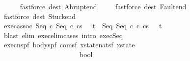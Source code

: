 \begin{isabellebody}
\ \ \isamarkupfalse%
\ \ \ {\isacharparenleft}fastforce\ dest{\isacharcolon}\ Abrupt{\isacharunderscore}end{\isacharparenright}\isanewline
\ \ \isamarkupfalse%
\ \ {\isacharparenleft}fastforce\ dest{\isacharcolon}\ Fault{\isacharunderscore}end{\isacharparenright}\isanewline
\ \ \isamarkupfalse%
\ {\isacharparenleft}fastforce\ dest{\isacharcolon}\ Stuck{\isacharunderscore}end{\isacharparenright}\isanewline
\ \ \isamarkupfalse%
%
\endisatagproof
{\isafoldproof}%
%
\isadelimproof
\isanewline
%
\endisadelimproof
\isanewline
\isanewline
{}\isamarkupfalse%
\ exec{\isacharunderscore}assoc{\isacharcolon}\ {\isachardoublequoteopen}{\isasymGamma}{\isasymturnstile}{\isasymlangle}Seq\ c{}\ {\isacharparenleft}Seq\ c{}\ c{}{\isacharparenright}{\isacharcomma}s{\isasymrangle}\ {\isasymRightarrow}\ \ t\ {\isacharequal}\ {\isasymGamma}{\isasymturnstile}{\isasymlangle}Seq\ {\isacharparenleft}Seq\ c{}\ c{}{\isacharparenright}\ c{}{\isacharcomma}s{\isasymrangle}\ {\isasymRightarrow}\ \ t{\isachardoublequoteclose}\isanewline
%
\isadelimproof
\ \ %
\endisadelimproof
%
\isatagproof
{}\isamarkupfalse%
\ {\isacharparenleft}blast\ elim{\isacharbang}{\isacharcolon}\ exec{\isacharunderscore}elim{\isacharunderscore}cases\ intro{\isacharcolon}\ exec{\isacharunderscore}Seq{\isacharprime}\ {\isacharparenright}%
\endisatagproof
{\isafoldproof}%
%
\isadelimproof
%
\endisadelimproof
%
\isamarkuptrue%
\isamarkupfalse%
\ {\isachardoublequoteopen}execn{\isachardoublequoteclose}{\isacharcolon}{\isacharcolon}{\isachardoublequoteopen}{\isacharbrackleft}{\isacharparenleft}{\isacharprime}s{\isacharcomma}{\isacharprime}p{\isacharcomma}{\isacharprime}f{\isacharparenright}\ body{\isacharcomma}{\isacharparenleft}{\isacharprime}s{\isacharcomma}{\isacharprime}p{\isacharcomma}{\isacharprime}f{\isacharparenright}\ com{\isacharcomma}{\isacharparenleft}{\isacharprime}s{\isacharcomma}{\isacharprime}f{\isacharparenright}\ xstate{\isacharcomma}nat{\isacharcomma}{\isacharparenleft}{\isacharprime}s{\isacharcomma}{\isacharprime}f{\isacharparenright}\ xstate{\isacharbrackright}\ \isanewline
\ \ \ \ \ \ \ \ \ \ \ \ \ \ \ \ \ \ \ \ \ \ {\isasymRightarrow}\ bool{\isachardoublequoteclose}\ {\isacharparenleft}{\isachardoublequoteopen}{\isacharunderscore}{\isasymturnstile}\ {\isasymlangle}{\isacharunderscore}{\isacharcomma}{\isacharunderscore}{\isasymrangle}\ {\isacharequal}{\isacharunderscore}{\isasymRightarrow}\ {\isacharunderscore}{\isachardoublequoteclose}\ \ {\isacharbrackleft}{}{}{\isacharcomma}{}{}{\isacharcomma}{}{}{\isacharcomma}{}{}{\isacharcomma}{}{}{\isacharbrackright}\ {}{}{\isacharparenright}\isanewline

\end{isabellebody}
